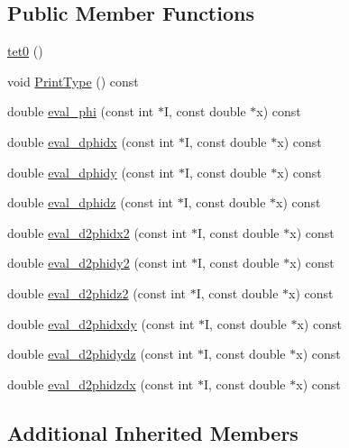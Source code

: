 \subsection*{Public Member Functions}
\begin{DoxyCompactItemize}
\item 
\mbox{\hyperlink{classfemus_1_1tet0_aa4de0524f2b5584f2627b4497226e58c}{tet0}} ()
\item 
void \mbox{\hyperlink{classfemus_1_1tet0_a0aa5059ca3b96f3b7f5d53d631bf736f}{Print\+Type}} () const
\item 
double \mbox{\hyperlink{classfemus_1_1tet0_a7d8d6040a264df9fe50440e9009f5ca4}{eval\+\_\+phi}} (const int $\ast$I, const double $\ast$x) const
\item 
double \mbox{\hyperlink{classfemus_1_1tet0_a5ebdbcdd7bcb5ef07e07b7952d2a34d0}{eval\+\_\+dphidx}} (const int $\ast$I, const double $\ast$x) const
\item 
double \mbox{\hyperlink{classfemus_1_1tet0_a1bbcc8a702fdb19e0b58f94bcfc98959}{eval\+\_\+dphidy}} (const int $\ast$I, const double $\ast$x) const
\item 
double \mbox{\hyperlink{classfemus_1_1tet0_ab4d0b4b59fcd80195ebeeaf1375db06b}{eval\+\_\+dphidz}} (const int $\ast$I, const double $\ast$x) const
\item 
double \mbox{\hyperlink{classfemus_1_1tet0_a59411acd2cd35da162ad6487fa947a68}{eval\+\_\+d2phidx2}} (const int $\ast$I, const double $\ast$x) const
\item 
double \mbox{\hyperlink{classfemus_1_1tet0_afc37f82556b5b073967bc48c7317e02f}{eval\+\_\+d2phidy2}} (const int $\ast$I, const double $\ast$x) const
\item 
double \mbox{\hyperlink{classfemus_1_1tet0_a8ce29003823d07fa76934c881b99aa40}{eval\+\_\+d2phidz2}} (const int $\ast$I, const double $\ast$x) const
\item 
double \mbox{\hyperlink{classfemus_1_1tet0_a22abf82712c0aa6a561280f8d9bef8ff}{eval\+\_\+d2phidxdy}} (const int $\ast$I, const double $\ast$x) const
\item 
double \mbox{\hyperlink{classfemus_1_1tet0_af44ea8094a0f62c9bc345df68798359c}{eval\+\_\+d2phidydz}} (const int $\ast$I, const double $\ast$x) const
\item 
double \mbox{\hyperlink{classfemus_1_1tet0_ab082238423f56a4a4810554511f5feb1}{eval\+\_\+d2phidzdx}} (const int $\ast$I, const double $\ast$x) const
\end{DoxyCompactItemize}
\subsection*{Additional Inherited Members}


